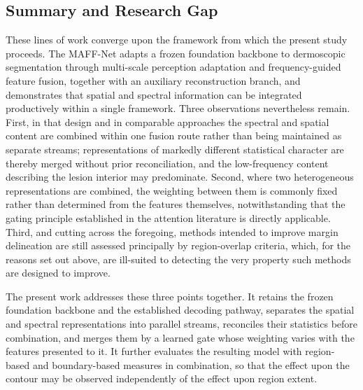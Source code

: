 \subsection{Summary and Research Gap}

These lines of work converge upon the framework from which the present study proceeds. The MAFF-Net \cite{ref15} adapts a frozen foundation backbone to dermoscopic segmentation through multi-scale perception adaptation and frequency-guided feature fusion, together with an auxiliary reconstruction branch, and demonstrates that spatial and spectral information can be integrated productively within a single framework. Three observations nevertheless remain. First, in that design and in comparable approaches the spectral and spatial content are combined within one fusion route rather than being maintained as separate streams; representations of markedly different statistical character are thereby merged without prior reconciliation, and the low-frequency content describing the lesion interior may predominate. Second, where two heterogeneous representations are combined, the weighting between them is commonly fixed rather than determined from the features themselves, notwithstanding that the gating principle established in the attention literature is directly applicable. Third, and cutting across the foregoing, methods intended to improve margin delineation are still assessed principally by region-overlap criteria, which, for the reasons set out above, are ill-suited to detecting the very property such methods are designed to improve.

The present work addresses these three points together. It retains the frozen foundation backbone and the established decoding pathway, separates the spatial and spectral representations into parallel streams, reconciles their statistics before combination, and merges them by a learned gate whose weighting varies with the features presented to it. It further evaluates the resulting model with region-based and boundary-based measures in combination, so that the effect upon the contour may be observed independently of the effect upon region extent.

